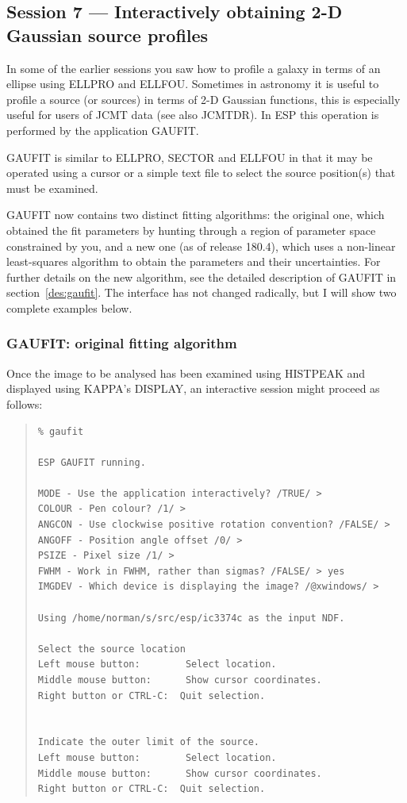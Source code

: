 \documentclass[twoside,11pt]{article}
\newcommand{\xref}[3]{#1}
\newcommand{\xlabel}[1]{}
\newenvironment{myquote}{\begin{quote}\begin{small}}{\end{small}\end{quote}}
\begin{document}
\subsection{Session 7 --- Interactively obtaining 2-D Gaussian source profiles}
\xlabel{SESSION7}
In some of the earlier sessions you saw how to profile a galaxy in
terms of an ellipse using ELLPRO and ELLFOU. Sometimes in astronomy
it is useful to profile a source (or sources) in terms of 2-D Gaussian 
functions, this is especially useful for users of JCMT data (see also
\xref{JCMTDR}{sun132}{}). In ESP this operation is performed by the
application GAUFIT. 

GAUFIT is similar to ELLPRO, SECTOR and ELLFOU in that it may be operated
using a cursor or a simple text file to select the source position(s) that 
must be examined. 

GAUFIT now contains two distinct fitting algorithms: the original one,
which obtained the fit parameters by hunting through a region of
parameter space constrained by you, and a new one (as of release
180.4), which uses a non-linear least-squares algorithm to obtain the
parameters and their uncertainties.  For further details on the new
algorithm, see the detailed description of GAUFIT in
section~\ref{des:gaufit}.  The interface has not changed radically,
but I will show two complete examples below.

\subsubsection{GAUFIT: original fitting algorithm}

Once the image to be analysed has been examined using 
HISTPEAK and displayed using \xref{KAPPA}{sun95}{}'s DISPLAY, an interactive 
session might proceed as follows:

\begin{myquote}
\begin{verbatim}
% gaufit 
 
ESP GAUFIT running.
 
MODE - Use the application interactively? /TRUE/ > 
COLOUR - Pen colour? /1/ > 
ANGCON - Use clockwise positive rotation convention? /FALSE/ > 
ANGOFF - Position angle offset /0/ > 
PSIZE - Pixel size /1/ > 
FWHM - Work in FWHM, rather than sigmas? /FALSE/ > yes
IMGDEV - Which device is displaying the image? /@xwindows/ > 
 
Using /home/norman/s/src/esp/ic3374c as the input NDF.
 
Select the source location
Left mouse button:        Select location.
Middle mouse button:      Show cursor coordinates.
Right button or CTRL-C:  Quit selection.
 
 
Indicate the outer limit of the source.
Left mouse button:        Select location.
Middle mouse button:      Show cursor coordinates.
Right button or CTRL-C:  Quit selection.
\end{verbatim}
\end{myquote}
\end{document}

